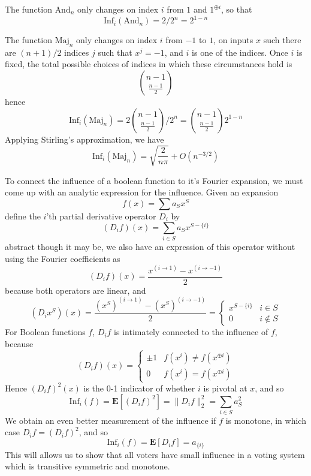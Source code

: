 \begin{example}
    The function $\text{And}_n$ only changes on index $i$ from $1$ and $1^{\oplus i}$, so that
    \[ \text{Inf}_i(\text{And}_n) = 2/2^n = 2^{1-n} \]
\end{example}

\begin{example}
    The function $\text{Maj}_n$ only changes on index $i$ from $-1$ to $1$, on inputs $x$ such there are $(n+1)/2$ indices $j$ such that $x^j = -1$, and $i$ is one of the indices. Once $i$ is fixed, the total possible choices of indices in which these circumstances hold is
    \[ {n - 1 \choose \frac{n-1}{2}} \]
    hence
    \[ \text{Inf}_i(\text{Maj}_n) = 2 {n-1 \choose \frac{n-1}{2}} / 2^n = {n-1 \choose \frac{n-1}{2}} 2^{1-n} \]
    Applying Stirling's approximation, we have
    \[ \text{Inf}_i(\text{Maj}_n) = \sqrt{\frac{2}{n\pi}} + O(n^{-3/2}) \]
\end{example}

To connect the influence of a boolean function to it's Fourier expansion, we must come up with an analytic expression for the influence. Given an expansion
%
\[ f(x) = \sum a_S x^S \]
%
define the $i$'th partial derivative operator $D_i$ by
%
\[ (D_if)(x) = \sum_{i \in S} a_S x^{S - \{ i \}} \]
%
abstract though it may be, we also have an expression of this operator without using the Fourier coefficients as
%
\[ (D_if)(x) = \frac{x^{(i \to 1)} - x^{(i \to -1)}}{2} \]
%
because both operators are linear, and
%
\[ (D_ix^S)(x) = \frac{(x^S)^{(i \to 1)} - (x^S)^{(i \to -1)}}{2} = \begin{cases} x^{S - \{ i \}} & i \in S \\ 0 & i \not \in S \end{cases} \]
%
For Boolean functions $f$, $D_if$ is intimately connected to the influence of $f$, because
%
\[ (D_if)(x) = \begin{cases} \pm 1 & f(x^i) \neq f(x^{\oplus i}) \\ 0 & f(x^i) = f(x^{\oplus i}) \end{cases} \]
%
Hence $(D_if)^2(x)$ is the 0-1 indicator of whether $i$ is pivotal at $x$, and so
%
\[ \text{Inf}_i(f) = \mathbf{E}[(D_if)^2] = \| D_if \|_2^2 = \sum_{i \in S} a_S^2 \]
%
We obtain an even better measurement of the influence if $f$ is monotone, in which case $D_if = (D_if)^2$, and so
%
\[ \text{Inf}_i(f) = \mathbf{E}[D_if] = a_{\{i\}} \]
%
This will allows us to show that all voters have small influence in a voting system which is transitive symmetric and monotone.

